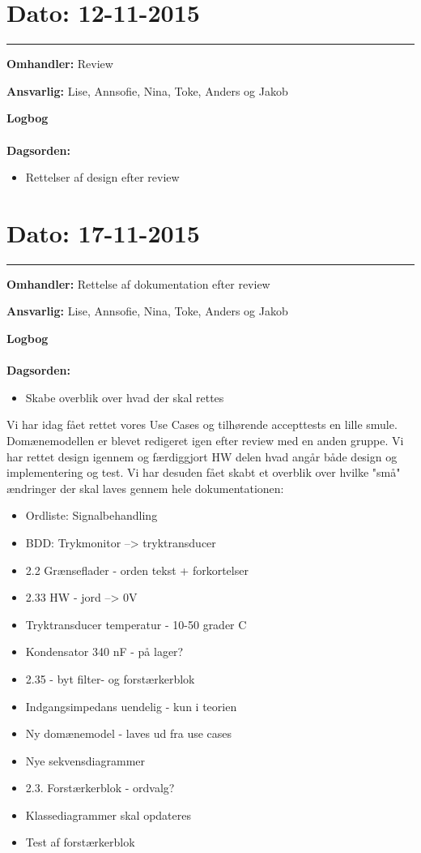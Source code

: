 \section{Dato: 12-11-2015 }
\hrule

\textbf{Omhandler:} Review 

\textbf{Ansvarlig:} Lise, Annsofie, Nina, Toke, Anders og Jakob

\textbf{Logbog}
\\
\\
\textbf{Dagsorden:}
\begin{itemize}
	\item Rettelser af design efter review
\end{itemize}



\section{Dato: 17-11-2015 }
\hrule

\textbf{Omhandler:} Rettelse af dokumentation efter review 

\textbf{Ansvarlig:} Lise, Annsofie, Nina, Toke, Anders og Jakob

\textbf{Logbog}
\\
\\
\textbf{Dagsorden:}
\begin{itemize}
	\item Skabe overblik over hvad der skal rettes
\end{itemize}

Vi har idag fået rettet vores Use Cases og tilhørende accepttests en lille smule.
Domænemodellen er blevet redigeret igen efter review med en anden gruppe.
Vi har rettet design igennem og færdiggjort HW delen hvad angår både design og implementering og test.
Vi har desuden fået skabt et overblik over hvilke "små" ændringer der skal laves gennem hele dokumentationen:
\begin{itemize}
	\item Ordliste: Signalbehandling
	\item BDD: Trykmonitor --> tryktransducer
	\item 2.2 Grænseflader - orden tekst + forkortelser
	\item 2.33 HW - jord --> 0V
	\item Tryktransducer temperatur - 10-50 grader C
	\item Kondensator 340 nF - på lager? 
	\item 2.35 - byt filter- og forstærkerblok
	\item Indgangsimpedans uendelig - kun i teorien
	\item Ny domænemodel - laves ud fra use cases
	\item Nye sekvensdiagrammer
	\item 2.3. Forstærkerblok - ordvalg?
	\item Klassediagrammer skal opdateres
	\item Test af forstærkerblok
\end{itemize} 



